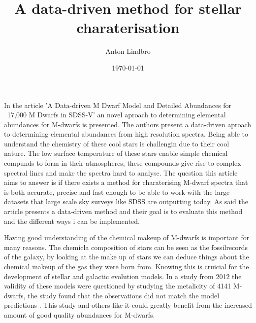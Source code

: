 \documentclass[a4paper]{article}
\title{A data-driven method for stellar charaterisation}
\author{Anton Lindbro}
\date{\today}
\begin{document}
\maketitle





In the article 'A Data-driven M Dwarf Model and Detailed Abundances for ~17,000 M Dwarfs in SDSS-V' \cite{2025ApJ...982...13B} an novel aproach to determining elemental abundances for M-dwarfs is presented. The authors present a data-driven aproach to determining elemental abundances from high resolution spectra. Being able to understand the chemistry of these cool stars is challengin due to their cool nature. The low surface temperature of these stars enable simple chemical compunds to form in their atmospheres, these compounds give rise to complex spectral lines and make the spectra hard to analyse. The question this  article aims to answer is if there exists a method for charaterising M-dwarf spectra that is both accurate, precise and fast enough to be able to work with the large datasets that large scale sky surveys like SDSS are outputting today. As said the article presents a data-driven method and their goal is to evaluate this method and the different ways i can be implemented. 

Having good understanding of the chemical makeup of M-dwarfs is important for many reasons. The chemicla composition of stars can be seen as the fossilrecords of the galaxy, by looking at the make up of stars we can deduce things about the chemical makeup of the gas they were born from. Knowing this is cruicial for the development of stellar and galactic evolution models. In a study from 2012 the validity of these models were questioned by studying the metalicity of 4141 M-dwarfs, the study found that the observations did not match the model predictions \cite{2012MNRAS.422.1489W}. This study and others like it could greatly benefit from the increased amount of good quality abundances for M-dwarfs.
\end{document}
